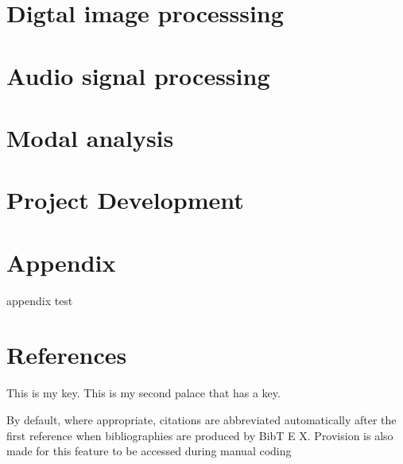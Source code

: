 \documentclass[UTF8]{book}
\begin{document}
	
	\part{Digtal image processsing}
	
	\part{Audio signal processing}
	
	\part{Modal analysis}	
	
	\part{Project Development}
	
	\begin{comment} 
	rather stupid, but helpful 
	\chapter{8-channel data acquistion system design}
	\chapter{32-channel data acquistion system design}
	\chapter{64-channel data acquistion system design}
	\end{comment}

	
	\part{Appendix}
	
	appendix test

	\part{References}
	


	This is my key.
	This is my second palace that has a key.

	By default, where appropriate, citations are abbreviated automatically after the	first reference when bibliographies are produced by BibT E X. Provision is also
	made for this feature to be accessed during manual coding
	
	\printindex

	
\end{document}
